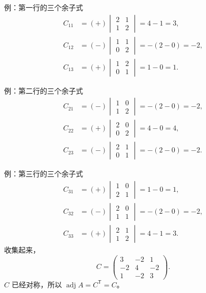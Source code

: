 \documentclass[fontset=windows, chinese, 10pt, xcolor=dvipsnames]{beamer}
\begin{document}
\begin{frame}{例：第一行的三个余子式}
  \begin{align*}
    C_{11}
    &= (+)\begin{vmatrix}2&1\\1&2\end{vmatrix}
     = 4-1=3,\\[0.3em]
    C_{12}
    &= (-)\begin{vmatrix}1&1\\0&2\end{vmatrix}
     = -(2-0)=-2,\\[0.3em]
    C_{13}
    &= (+)\begin{vmatrix}1&2\\0&1\end{vmatrix}
     = 1-0=1.
  \end{align*}
\end{frame}

\begin{frame}{例：第二行的三个余子式}
  \begin{align*}
    C_{21}
    &= (-)\begin{vmatrix}1&0\\1&2\end{vmatrix}
     = -(2-0)=-2,\\[0.3em]
    C_{22}
    &= (+)\begin{vmatrix}2&0\\0&2\end{vmatrix}
     = 4-0=4,\\[0.3em]
    C_{23}
    &= (-)\begin{vmatrix}2&1\\0&1\end{vmatrix}
     = -(2-0)=-2.
  \end{align*}
\end{frame}

\begin{frame}{例：第三行的三个余子式}
  \begin{align*}
    C_{31}
    &= (+)\begin{vmatrix}1&0\\2&1\end{vmatrix}
     = 1-0=1,\\[0.3em]
    C_{32}
    &= (-)\begin{vmatrix}2&0\\1&1\end{vmatrix}
     = -(2-0)=-2,\\[0.3em]
    C_{33}
    &= (+)\begin{vmatrix}2&1\\1&2\end{vmatrix}
     = 4-1=3.
  \end{align*}
  收集起来，
  \begin{equation*}
    C=
    \begin{pmatrix}
      3&-2&1\\
      -2&4&-2\\
      1&-2&3
    \end{pmatrix}.
  \end{equation*}
  $C$ 已经对称，所以 $\operatorname{adj} A=C^{\mathsf T}=C$。
\end{frame}
\end{document}

